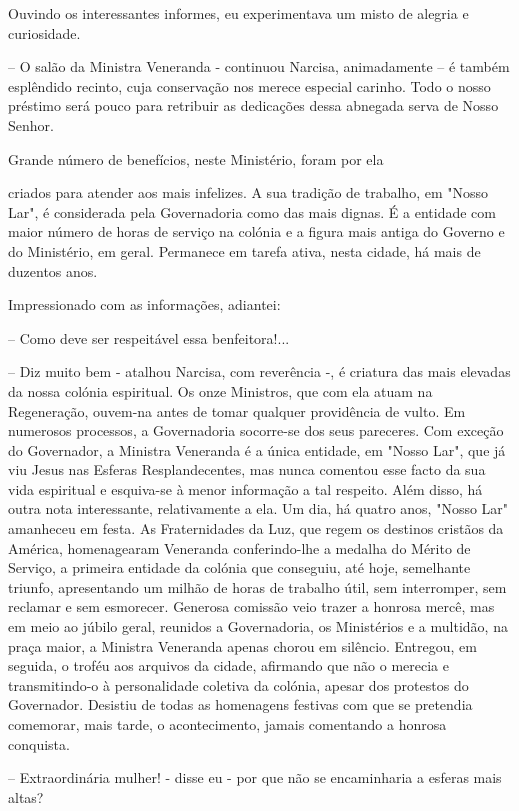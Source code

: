 \documentclass[portuguese,12pt,a4paper]{scrbook}
\begin{document}
	Ouvindo os interessantes informes, eu experimentava um misto de alegria e curiosidade.
	
	– O salão da Ministra Veneranda - continuou Narcisa, animadamente – é também esplêndido recinto, cuja conservação nos merece especial carinho. Todo o nosso préstimo será pouco para retribuir as dedicações dessa abnegada serva de Nosso Senhor.
	
	Grande número de benefícios, neste Ministério, foram por ela
	
	
	criados para atender aos mais infelizes. A sua tradição de trabalho, em "Nosso Lar", é considerada pela Governadoria como das mais dignas. É a entidade com maior número de horas de serviço na colónia e a figura mais antiga do Governo e do Ministério, em geral. Permanece em tarefa ativa, nesta cidade, há mais de duzentos anos.
	
	Impressionado com as informações, adiantei:
	
	– Como deve ser respeitável essa benfeitora!...
	
	– Diz muito bem - atalhou Narcisa, com reverência -, é criatura das mais elevadas da nossa colónia espiritual. Os onze Ministros, que com ela atuam na Regeneração, ouvem-na antes de tomar qualquer providência de vulto. Em numerosos processos, a Governadoria socorre-se dos seus pareceres. Com exceção do Governador, a Ministra Veneranda é a única entidade, em "Nosso Lar", que já viu Jesus nas Esferas Resplandecentes, mas nunca comentou esse facto da sua vida espiritual e esquiva-se à menor informação a tal respeito. Além disso, há outra nota interessante, relativamente a ela. Um dia, há quatro anos, "Nosso Lar" amanheceu em festa. As Fraternidades da Luz, que regem os destinos cristãos da América, homenagearam Veneranda conferindo-lhe a medalha do Mérito de Serviço, a primeira entidade da colónia que conseguiu, até hoje, semelhante triunfo, apresentando um milhão de horas de trabalho útil, sem interromper, sem reclamar e sem esmorecer. Generosa comissão veio trazer a honrosa mercê, mas em meio ao júbilo geral, reunidos a Governadoria, os Ministérios e a multidão, na praça maior, a Ministra Veneranda apenas chorou em silêncio. Entregou, em seguida, o troféu aos arquivos da cidade, afirmando que não o merecia e transmitindo-o à personalidade coletiva da colónia, apesar dos protestos do Governador. Desistiu de todas as homenagens festivas com que se pretendia comemorar, mais tarde, o acontecimento, jamais comentando a honrosa conquista.
	
	
	– Extraordinária mulher! - disse eu - por que não se encaminharia a esferas mais altas?
	
\end{document}
